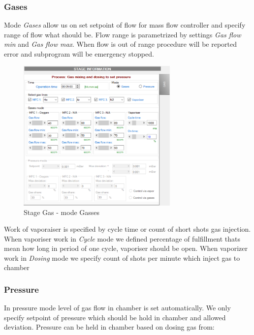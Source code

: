 \subsubsection{Gases}

Mode \textit{Gases} allow us on set setpoint of flow for mass flow controller and specify range of flow what should be. Flow range is parametrized by settings \textit{Gas flow min} and \textit{Gas flow max}.  When flow is out of range procedure will be reported error and subprogram will be emergency stopped. 

	\begin{figure}[!h] 
	\centering \includegraphics[width=0.7\textwidth]{Graphic/Programs/Gas_ModeGas.png}	
	\caption{Stage Gas - mode Gasses}
	\label{stage_gas_ mode_gasses}
	\end{figure}
	\FloatBarrier

Work of vaporaiser is specified by cycle time or count of short shots gas injection. When vaporiser work in \textit{Cycle} mode we defined percentage of fulfillment thats mean how long in period of one cycle, vaporiser should be open. When vaporizer work in \textit{Dosing} mode we specify count of shots per minute which inject gas to chamber 

\subsubsection{Pressure}

In pressure mode level of gas flow in chamber is set automatically. We only specify setpoint of pressure which should be hold in chamber and allowed deviation.  Pressure can be held in chamber based on dosing gas from:

